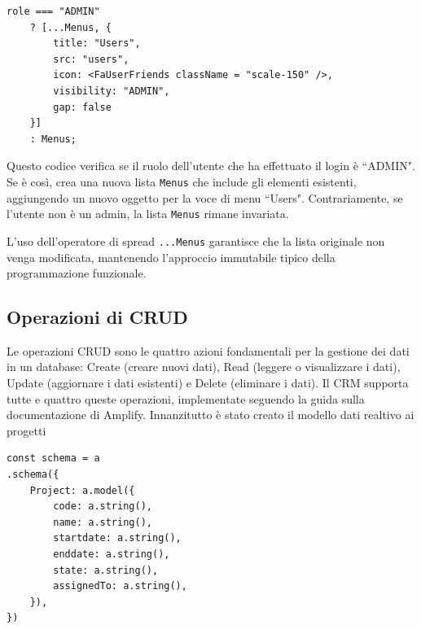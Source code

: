 \documentclass[target=bach,aauheader=,style=]{thud}
\begin{document}
\begin{lstlisting}[caption=Verifica ruolo]
role === "ADMIN" 
    ? [...Menus, {
        title: "Users",
        src: "users",
        icon: <FaUserFriends className = "scale-150" />,
        visibility: "ADMIN",
        gap: false
    }]
    : Menus;
\end{lstlisting}

\noindent Questo codice verifica se il ruolo dell'utente che ha effettuato il login è ``ADMIN". Se è così, crea una nuova lista \texttt{Menus} che include gli elementi esistenti, aggiungendo un nuovo oggetto per la voce di menu ``Users". Contrariamente, se l'utente non è un admin, la lista \texttt{Menus} rimane invariata. 

\noindent L'uso dell'operatore di spread \texttt{...Menus} garantisce che la lista originale non venga modificata, mantenendo l'approccio immutabile tipico della programmazione funzionale.

\subsection{Operazioni di CRUD}
Le operazioni CRUD sono le quattro azioni fondamentali per la gestione dei dati in un database: Create (creare nuovi dati), Read (leggere o visualizzare i dati), Update (aggiornare i dati esistenti) e Delete (eliminare i dati). Il CRM supporta tutte e quattro queste operazioni, implementate seguendo la guida \cite{awsamplifynextjs2024} sulla documentazione di Amplify. Innanzitutto è stato creato il modello dati realtivo ai progetti

\begin{lstlisting}[caption=Parte del file \texttt{amplify/data/resource.ts}]
const schema = a
.schema({
    Project: a.model({
        code: a.string(),
        name: a.string(),
        startdate: a.string(),
        enddate: a.string(),
        state: a.string(),
        assignedTo: a.string(),
    }),
})
\end{lstlisting}
\end{document}
